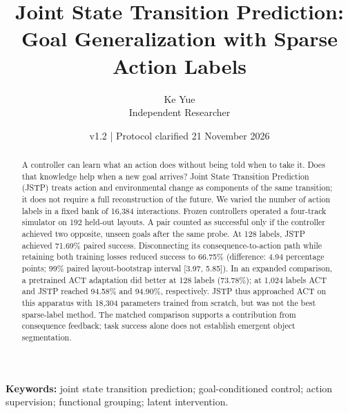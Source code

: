 \documentclass[11pt]{article}
\title{Joint State Transition Prediction:\\Goal Generalization with Sparse Action Labels}
\author{Ke Yue\\\small Independent Researcher}
\date{v1.2 \quad | \quad Protocol clarified 21 November 2026}
\begin{document}
\maketitle


\par

\par

\par

\begin{abstract}

A controller can learn what an action does without being told when to take it. Does that knowledge help when a new goal arrives? Joint State Transition Prediction (JSTP) treats action and environmental change as components of the same transition; it does not require a full reconstruction of the future. We varied the number of action labels in a fixed bank of 16,384 interactions. Frozen controllers operated a four-track simulator on 192 held-out layouts. A pair counted as successful only if the controller achieved two opposite, unseen goals after the same probe. At 128 labels, JSTP achieved 71.69\% paired success. Disconnecting its consequence-to-action path while retaining both training losses reduced success to 66.75\% (difference: 4.94 percentage points; 99\% paired layout-bootstrap interval [3.97, 5.85]). In an expanded comparison, a pretrained ACT adaptation did better at 128 labels (73.78\%); at 1,024 labels ACT and JSTP reached 94.58\% and 94.90\%, respectively. JSTP thus approached ACT on this apparatus with 18,304 parameters trained from scratch, but was not the best sparse-label method. The matched comparison supports a contribution from consequence feedback; task success alone does not establish emergent object segmentation.

\end{abstract}

\noindent\small \textbf{Keywords:} joint state transition prediction; goal-conditioned control; action supervision; functional grouping; latent intervention.\normalsize
\end{document}
